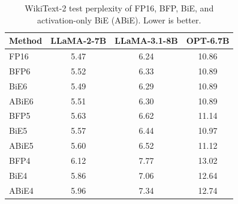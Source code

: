 \begin{table}[t]
    \centering
    \caption{WikiText-2 test perplexity of FP16, BFP, BiE, and activation-only BiE (ABiE). Lower is better.}
    \label{tab:ppl_bfp_bie_abie_4to6}
    \begin{tabular}{lccc}
        \toprule
        Method & LLaMA-2-7B & LLaMA-3.1-8B & OPT-6.7B \\
        \midrule
        FP16  & 5.47 & 6.24 & 10.86 \\
        \midrule
        BFP6  & 5.52 & 6.33 & 10.89 \\
        BiE6  & 5.49 & 6.29 & 10.89 \\
        ABiE6 & 5.51 & 6.30 & 10.89 \\
        \addlinespace
        BFP5  & 5.63 & 6.62 & 11.14 \\
        BiE5  & 5.57 & 6.44 & 10.97 \\
        ABiE5 & 5.60 & 6.52 & 11.12 \\
        \addlinespace
        BFP4  & 6.12 & 7.77 & 13.02 \\
        BiE4  & 5.86 & 7.06 & 12.64 \\
        ABiE4 & 5.96 & 7.34 & 12.74 \\
        \bottomrule
    \end{tabular}
\end{table}
